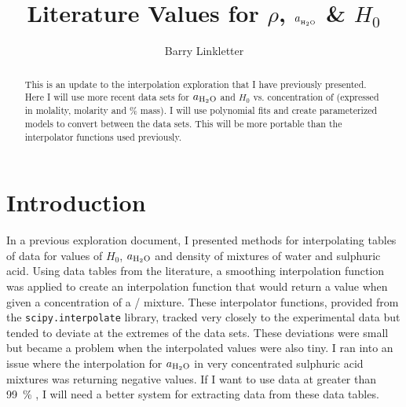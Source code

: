 \documentclass[]{tufte-handout}
\title{Literature Values for $\rho$, $a_{_{\ce{H2O}}}$ \& $H_0$}
\author[Barry Linkletter]{Barry Linkletter}
\date{} %
\begin{document}
\justifying

\maketitle
{}
\begin{abstract}

\noindent This is an update to the interpolation exploration that I have previously presented. Here I will use more recent data sets for $a_{\ce{H2O}}$ and $H_0$ vs. concentration of  (expressed in molality, molarity and \% mass). I will use polynomial fits and create parameterized models to convert between the data sets. This will be more portable than the interpolator functions used previously.

\end{abstract}




\section{Introduction}

In a previous exploration document, I presented methods for interpolating tables of data for values of $H_0$, $a_{\ce{H2O}}$ and density of mixtures of water and sulphuric acid. Using data tables from the literature, a smoothing interpolation function was applied to create an interpolation function that would return a value when given a concentration of a / mixture. These interpolator functions, provided from the \texttt{scipy.interpolate} library, tracked very closely to the experimental data but tended to deviate at the extremes of the data sets. These deviations were small but became a problem when the interpolated values were also tiny. I ran into an issue where the interpolation for $a_{\ce{H2O}}$ in very concentrated sulphuric acid mixtures was returning negative values. If I want to use data at greater than \qty{99}{\percent} , I will need a better system for extracting data from these data tables.
\end{document}

